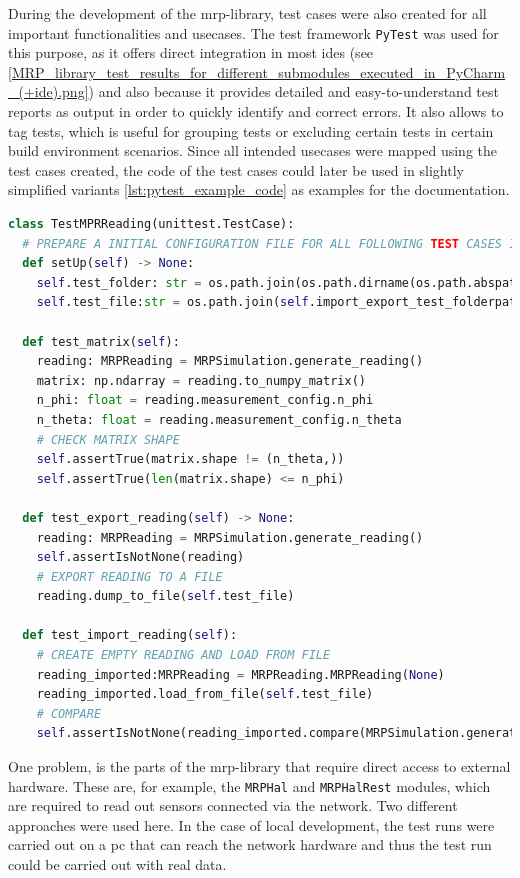 During the development of the \gls{mrp}-library, test cases were also
created for all important functionalities and usecases. The test
framework \passthrough{\lstinline!PyTest!} \cite{PyTest} was used
for this purpose, as it offers direct integration in most \gls{ide}s
(see
\ref{MRP_library_test_results_for_different_submodules_executed_in_PyCharm_(+ide).png})
and also because it provides detailed and easy-to-understand test
reports as output in order to quickly identify and correct errors. It
also allows to tag tests, which is useful for grouping tests or
excluding certain tests in certain build environment scenarios. Since
all intended usecases were mapped using the test cases created, the code
of the test cases could later be used in slightly simplified variants
\ref{lst:pytest_example_code} as examples for the documentation.

\begin{lstlisting}[language=Python, caption={Example pytest class for testing MRPReading module functions}, label=lst:pytest_example_code]
class TestMPRReading(unittest.TestCase):
  # PREPARE A INITIAL CONFIGURATION FILE FOR ALL FOLLOWING TEST CASES IN THIS FILE
  def setUp(self) -> None:
    self.test_folder: str = os.path.join(os.path.dirname(os.path.abspath(__file__)), "tmp")
    self.test_file:str = os.path.join(self.import_export_test_folderpath, "tmp")

  def test_matrix(self):
    reading: MRPReading = MRPSimulation.generate_reading()
    matrix: np.ndarray = reading.to_numpy_matrix()
    n_phi: float = reading.measurement_config.n_phi
    n_theta: float = reading.measurement_config.n_theta
    # CHECK MATRIX SHAPE
    self.assertTrue(matrix.shape != (n_theta,))
    self.assertTrue(len(matrix.shape) <= n_phi)

  def test_export_reading(self) -> None:
    reading: MRPReading = MRPSimulation.generate_reading()
    self.assertIsNotNone(reading)
    # EXPORT READING TO A FILE
    reading.dump_to_file(self.test_file)

  def test_import_reading(self):
    # CREATE EMPTY READING AND LOAD FROM FILE
    reading_imported:MRPReading = MRPReading.MRPReading(None)
    reading_imported.load_from_file(self.test_file)
    # COMPARE
    self.assertIsNotNone(reading_imported.compare(MRPSimulation.generate_reading()))
\end{lstlisting}

One problem, is the parts of the \gls{mrp}-library that require direct
access to external hardware. These are, for example, the
\passthrough{\lstinline!MRPHal!} and
\passthrough{\lstinline!MRPHalRest!} modules, which are required to read
out sensors connected via the network. Two different approaches were
used here. In the case of local development, the test runs were carried
out on a \gls{pc} that can reach the network hardware and thus the test
run could be carried out with real data.

